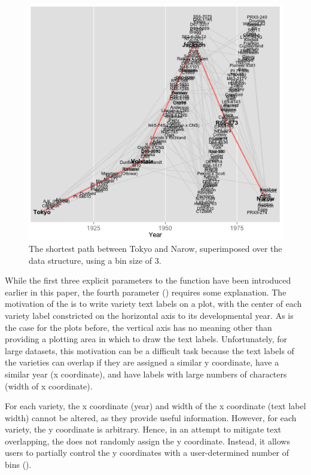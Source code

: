 \documentclass[article,shortnames]{jss}
\begin{document}
\begin{figure}%
    \centering
    \includegraphics[width=\textwidth]{fig3}
    \caption{The shortest path between Tokyo and Narow, superimposed over the data structure, using a bin size of 3.}
    \label{fig:fig3}
\end{figure}

While the first three explicit parameters to the function  have been introduced earlier in this paper, the fourth parameter () requires some explanation. The motivation of the  is to write variety text labels on a plot, with the center of each variety label constricted on the horizontal axis to its developmental year. As is the case for the plots before, the vertical axis has no meaning other than providing a plotting area in which to draw the text labels. Unfortunately, for large datasets, this motivation can be a difficult task because the text labels of the varieties can overlap if they are assigned a similar y coordinate, have a similar year (x coordinate), and have labels with large numbers of characters (width of x coordinate).

For each variety, the x coordinate (year) and width of the x coordinate (text label width) cannot be altered, as they provide useful information. However, for each variety, the y coordinate is arbitrary. Hence, in an attempt to mitigate text overlapping, the  does not randomly assign the y coordinate. Instead, it allows users to partially control the y coordinates with a user-determined number of bins ().
\end{document}
